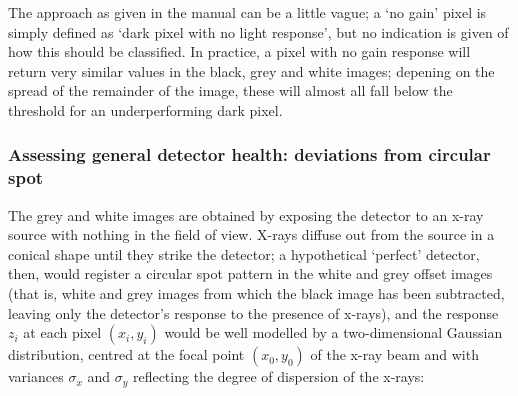 \documentclass[\main/IO-Pixels.tex]{subfiles}
\begin{document}
The approach as given in the manual can be a little vague; a `no gain' pixel is simply defined as `dark pixel with no light response', but no indication is given of how this should be classified. In practice, a pixel with no gain response will return very similar values in the black, grey and white images; depening on the spread of the remainder of the image, these will almost all fall below the threshold for an underperforming dark pixel.  



\subsubsection{Assessing general detector health: deviations from circular spot}


The grey and white images are obtained by exposing the detector to an x-ray source with nothing in the field of view. X-rays diffuse out from the source in a conical shape until they strike the detector; a hypothetical `perfect' detector,  then, would register a circular spot pattern in the white and grey offset images (that is, white and grey images from which the black image has been subtracted, leaving only the detector's response to the presence of x-rays), and the response $z_i$ at each pixel $(x_i, y_i)$ would be well modelled by a two-dimensional Gaussian distribution, centred at the focal point $(x_0, y_0)$ of the x-ray beam and with variances $\sigma_x$ and $\sigma_y$ reflecting the degree of dispersion of the x-rays:
\end{document}
